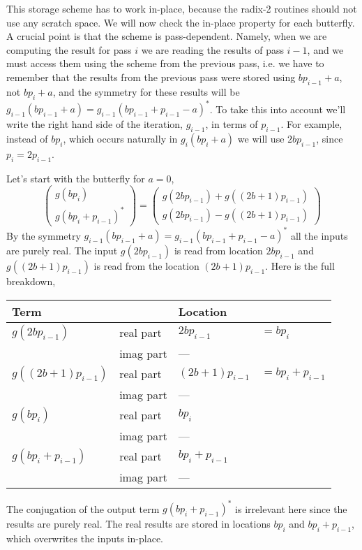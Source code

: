 \documentclass[fleqn,12pt]{article}
\begin{document}
This storage scheme has to work in-place, because the radix-2 routines
should not use any scratch space. We will now check the in-place
property for each butterfly.  A crucial point is that the scheme is
pass-dependent. Namely, when we are computing the result for pass $i$
we are reading the results of pass $i-1$, and we must access them
using the scheme from the previous pass, i.e. we have to remember that
the results from the previous pass were stored using $b p_{i-1} + a$,
not $b p_i + a$, and the symmetry for these results will be $g_{i-1}(b
p_{i-1} + a) = g_{i-1}(b p_{i-1} + p_{i-1} - a)^*$. To take this into
account we'll write the right hand side of the iteration, $g_{i-1}$,
in terms of $p_{i-1}$. For example, instead of $b p_i$, which occurs
naturally in $g_i(b p_i + a)$ we will use $2 b p_{i-1}$, since $p_i =
2 p_{i-1}$.

Let's start with the butterfly for $a = 0$,
%
\begin{equation}
\left(
\begin{array}{c} 
g(b p_i) \\
g(b p_i + p_{i-1})^*
\end{array}
\right)
=
\left(
\begin{array}{c}
g(2 b p_{i-1}) + g((2 b + 1) p_{i-1}) \\
g(2 b p_{i-1}) - g((2 b + 1) p_{i-1})
\end{array}
\right)
\end{equation}
% 
By the symmetry $g_{i-1}(b p_{i-1} + a) = g_{i-1}(b p_{i-1} + p_{i-1}
- a)^*$ all the inputs are purely real.  The input $g(2 b p_{i-1})$ is
read from location $2 b p_{i-1}$ and $g((2 b + 1) p_{i-1})$ is read
from the location $(2 b + 1) p_{i-1}$. Here is the full breakdown,
%
\begin{center}
\renewcommand{\arraystretch}{1.5}
\begin{tabular}{|l|lll|}
\hline Term & & Location & \\
\hline
$g(2 b p_{i-1})$        
        & real part & $2 b p_{i-1} $ &$= b p_i$ \\
        & imag part & --- & \\
$g((2 b+1) p_{i-1})$ 
        & real part & $(2 b + 1) p_{i-1}  $&$= b p_i + p_{i-1} $ \\
        & imag part & --- & \\
\hline
$g(b p_{i})$ 
        & real part & $b p_i$ &\\
        & imag part & --- & \\
$g(b p_{i} + p_{i-1})$ 
        & real part & $b p_i + p_{i-1}$& \\
        & imag part & --- &  \\
\hline
\end{tabular}
\end{center}
%
The conjugation of the output term $g(b p_i + p_{i-1})^*$ is
irrelevant here since the results are purely real. The real results
are stored in locations $b p_i$ and $b p_i + p_{i-1}$, which
overwrites the inputs in-place.
\end{document}

